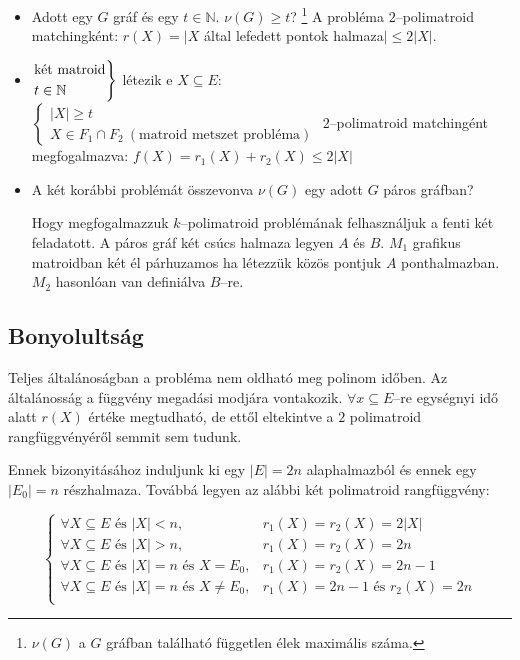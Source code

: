 \begin{itemize}
  \item Adott egy $G$ gráf és egy $t \in \mathbb{N}$. $\nu(G) \geq t$? \footnote{
   $\nu(G)$ a $G$ gráfban található független élek maximális száma.
  } A probléma $2$--polimatroid matchingként: $r(X)=|X$
  által lefedett pontok halmaza$| \leq 2|X|$.
  \item $\begin{rcases}
  \mbox{két matroid} \\
  t \in \mathbb{N}
  \end{rcases}$ létezik  e $X \subseteq E$: $\begin{cases}
  |X| \geq t \\
  X \in F_1 \cap F_2~(\mbox{matroid metszet probléma})
  \end{cases}$ 
  $2$--polimatroid matchingént megfogalmazva: $f(X)=r_1(X)+r_2(X) \leq 2|X|$
  \item A két korábbi problémát összevonva $\nu(G)$ egy adott $G$ páros gráfban?
  
  Hogy megfogalmazzuk $k$--polimatroid problémának felhasználjuk a fenti két
  feladatott. A páros gráf két csúcs halmaza legyen $A$ és $B$. $M_1$ grafikus
  matroidban két él párhuzamos ha létezzük közös pontjuk $A$ ponthalmazban.
  $M_2$ hasonlóan van definiálva $B$--re. 
\end{itemize}

\subsection{Bonyolultság}
Teljes általánoságban a probléma nem oldható meg polinom időben. Az általánosság
a függvény megadási modjára vontakozik. $\forall x \subseteq E$--re egységnyi
idő alatt $r(X)$ értéke megtudható, de ettől eltekintve a $2$ polimatroid
rangfüggvényéről semmit sem tudunk.

Ennek bizonyitásához induljunk ki egy $|E|=2n$ alaphalmazból és ennek egy
$|E_0|=n$ részhalmaza. Továbbá legyen az alábbi két polimatroid rangfüggvény:

\[
\begin{cases}
\forall X \subseteq E \mbox{ és } |X|<n, & r_1(X)=r_2(X)=2|X| \\
\forall X \subseteq E \mbox{ és } |X|>n, & r_1(X)=r_2(X)=2n \\
\forall X \subseteq E \mbox{ és } |X|=n \mbox{ és } X = E_0, & r_1(X)=r_2(X)=2n-1\\
\forall X \subseteq E \mbox{ és } |X|=n \mbox{ és } X \neq E_0, & r_1(X)=2n-1 \mbox{ és }r_2(X)=2n\\
\end{cases}
\]

